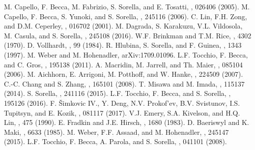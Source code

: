 \documentclass[aps,superscriptaddress,amsmath,amssymb,twocolumn,showpacs,floatfix,english]{revtex4}
\begin{document}
\begin{thebibliography}{99}
 M. Capello, F. Becca, M. Fabrizio, S. Sorella, and E. Tosatti, , 026406 (2005).
 M. Capello, F. Becca, S. Yunoki, and S. Sorella, , 245116 (2006).
 C. Lin, F.H. Zong, and D.M. Ceperley, , 016702 (2001).
 M. Dagrada, S. Karakuzu, V.L. Vildosola, M. Casula, and S. Sorella, , 245108 (2016).
 W.F. Brinkman and T.M. Rice, , 4302 (1970).
 D. Vollhardt, , 99 (1984).
 R. Hlubina, S. Sorella, and F. Guinea, , 1343 (1997).
 M. Weber and M. Hohenadler, arXiv:1709.01096.
 L.F. Tocchio, F. Becca, and C. Gros, , 195138 (2011).
 A. Macridin, M. Jarrell, and Th. Maier, , 085104 (2006).
 M. Aichhorn, E. Arrigoni, M. Potthoff, and W. Hanke, , 224509 (2007).
 C.-C. Chang and S. Zhang, , 165101 (2008).
 T. Misawa and M. Imada, , 115137 (2014).
 S. Sorella, , 241116 (2015).
 L.F. Tocchio, F. Becca, and S. Sorella, , 195126 (2016).
 F. \v Simkovic IV., Y. Deng, N.V. Prokof'ev, B.V. Svistunov, I.S. Tupitsyn, and E. Kozik, , 081117 (2017). 
 V.J. Emery, S.A. Kivelson, and H.Q. Lin, , 475 (1990).
 E. Fradkin and J.E. Hirsch, , 1680 (1983).
 D. Baeriswyl and K. Maki, , 6633 (1985).
 M. Weber, F.F. Assaad, and M. Hohenadler, , 245147 (2015).
 L.F. Tocchio, F. Becca, A. Parola, and S. Sorella, , 041101 (2008).
\end{thebibliography}
\end{document}
